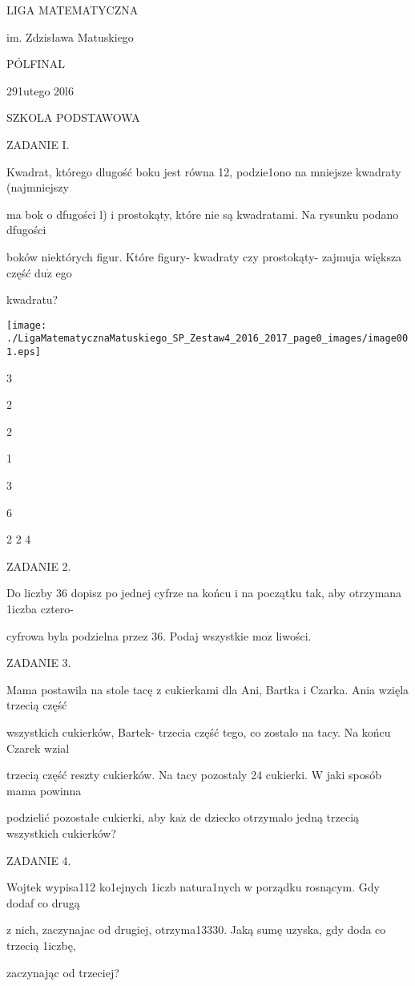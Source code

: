 \documentclass[a4paper,12pt]{article}
\begin{document}
LIGA MATEMATYCZNA

im. Zdzisława Matuskiego

PÓLFINAL

291utego 20l6

SZKOLA PODSTAWOWA

ZADANIE I.

Kwadrat, którego dlugość boku jest równa 12, podzie1ono na mniejsze kwadraty (najmniejszy

ma bok o dfugości l) i prostokąty, które nie są kwadratami. Na rysunku podano dfugości

boków niektórych figur. Które figury- kwadraty czy prostokąty- zajmuja większa część $\mathrm{d}\mathrm{u}\dot{\mathrm{z}}$ ego

kwadratu?
\begin{center}
\texttt{[image: ./LigaMatematycznaMatuskiego\_SP\_Zestaw4\_2016\_2017\_page0\_images/image001.eps]}
\end{center}
3

2

2

1

3

6

2 2 4

ZADANIE 2.

Do liczby 36 dopisz po jednej cyfrze na końcu i na początku tak, aby otrzymana 1iczba cztero-

cyfrowa byla podzielna przez 36. Podaj wszystkie $\mathrm{m}\mathrm{o}\dot{\mathrm{z}}$ liwości.

ZADANIE 3.

Mama postawila na stole tacę z cukierkami dla Ani, Bartka i Czarka. Ania wzięla trzecią część

wszystkich cukierków, Bartek- trzecia część tego, co zostalo na tacy. Na końcu Czarek wzial

trzecią część reszty cukierków. Na tacy pozostaly 24 cukierki. $\mathrm{W}$ jaki sposób mama powinna

podzielić pozostałe cukierki, aby $\mathrm{k}\mathrm{a}\dot{\mathrm{z}}$ de dziecko otrzymalo jedną trzecią wszystkich cukierków?

ZADANIE 4.

Wojtek wypisa112 ko1ejnych 1iczb natura1nych w porządku rosnącym. Gdy dodaf co drugą

z nich, zaczynajac od drugiej, otrzyma13330. Jaką sumę uzyska, gdy doda co trzecią 1iczbę,

zaczynając od trzeciej?
\end{document}
